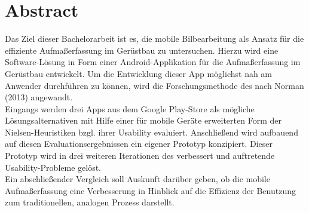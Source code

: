 \chapter*{\centering Abstract}
Das Ziel dieser Bachelorarbeit ist es, die mobile Bilbearbeitung als Ansatz für die effiziente Aufmaßerfassung im Gerüstbau zu untersuchen.
Hierzu wird eine Software-Lösung in Form einer Android-Applikation für die Aufmaßerfassung im Gerüstbau entwickelt.
Um die Entwicklung dieser App möglichst nah am Anwender durchführen zu können, wird die Forschungsmethode des \hcdp{} nach Norman (2013) angewandt. \\

Eingangs werden drei Apps aus dem Google Play-Store als mögliche Lösungsalternativen mit Hilfe einer für mobile Geräte erweiterten Form der Nielsen-Heuristiken bzgl. ihrer Usability evaluiert.
Anschließend wird aufbauend auf diesen Evaluationsergebnissen ein eigener Prototyp konzipiert.
Dieser Prototyp wird in drei weiteren Iterationen des \hcdp{} verbessert und auftretende Usability-Probleme gelöst.  \\

Ein abschließender Vergleich soll Auskunft darüber geben, ob die mobile Aufmaßerfassung eine Verbesserung in Hinblick auf die Effizienz der Benutzung zum traditionellen, analogen Prozess darstellt.
